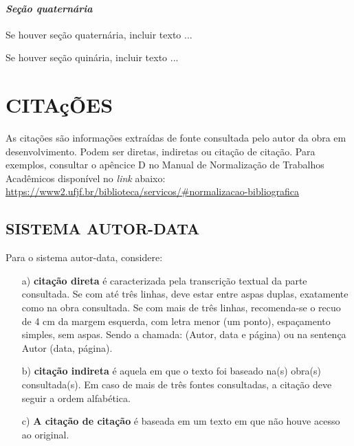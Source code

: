 \documentclass[
  oneside, %
  english,
  brazil
]{abntbibufjf}
\begin{document}

\subsubsection{\textit{Seção quaternária}} %

Se houver seção quaternária, incluir texto ...


Se houver seção quinária, incluir texto ...


\chapter{CITAç\~{O}ES} %

As citações são informaç\~{o}es extraídas de fonte consultada pelo autor da obra em desenvolvimento. Podem ser diretas, indiretas ou citação de citação. Para exemplos, consultar o apêncice D no Manual de Normalização de Trabalhos Acadêmicos disponível no \textit{link} abaixo: \\
\url{https://www2.ufjf.br/biblioteca/servicos/#normalizacao-bibliografica}

\section{SISTEMA AUTOR-DATA} %

Para o sistema autor-data, considere:
\begin{itemize}
  \item[a)] \textbf{citação direta} é caracterizada pela transcriç\~{a}o textual da parte consultada. Se com até três linhas, deve estar entre aspas duplas, exatamente como na obra consultada. Se com mais de três linhas, recomenda-se o recuo de 4 cm da margem esquerda, com letra menor (um ponto), espaçamento simples, sem aspas. Sendo a chamada: (Autor, data e página) ou na sentença Autor (data, página).
  \item[b)] \textbf{citaç\~{a}o indireta} é aquela em que o texto foi baseado na(s) obra(s) consultada(s). Em caso de mais de três fontes consultadas, a citaç\~{a}o deve seguir a ordem alfabética.
  \item[c)] \textbf{A citaç\~{a}o de citaç\~{a}o} é baseada em um texto em que não houve acesso ao original.
\end{itemize}
\end{document}
